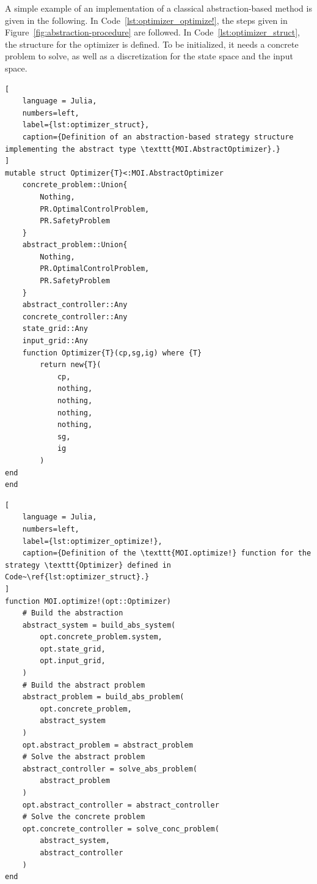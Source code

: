 \documentclass{juliacon}
\begin{document}
A simple example of an implementation of a classical abstraction-based method is given in the following. In Code~\ref{lst:optimizer_optimize!}, the steps given in Figure~\ref{fig:abstraction-procedure} are followed. In Code~\ref{lst:optimizer_struct}, the structure for the optimizer is defined. To be initialized, it needs a concrete problem to solve, as well as a discretization for the state space and the input space.
\begin{lstlisting}[
    language = Julia, 
    numbers=left, 
    label={lst:optimizer_struct}, 
    caption={Definition of an abstraction-based strategy structure implementing the abstract type \texttt{MOI.AbstractOptimizer}.}
]
mutable struct Optimizer{T}<:MOI.AbstractOptimizer
    concrete_problem::Union{
        Nothing, 
        PR.OptimalControlProblem, 
        PR.SafetyProblem
    }
    abstract_problem::Union{
        Nothing, 
        PR.OptimalControlProblem, 
        PR.SafetyProblem
    }
    abstract_controller::Any
    concrete_controller::Any
    state_grid::Any
    input_grid::Any 
    function Optimizer{T}(cp,sg,ig) where {T}
        return new{T}(
            cp, 
            nothing, 
            nothing, 
            nothing, 
            nothing, 
            sg, 
            ig
        )
end
end
\end{lstlisting}
\begin{lstlisting}[
    language = Julia, 
    numbers=left, 
    label={lst:optimizer_optimize!}, 
    caption={Definition of the \texttt{MOI.optimize!} function for the strategy \texttt{Optimizer} defined in Code~\ref{lst:optimizer_struct}.}
]
function MOI.optimize!(opt::Optimizer)
    # Build the abstraction
    abstract_system = build_abs_system(
        opt.concrete_problem.system,
        opt.state_grid,
        opt.input_grid,
    )
    # Build the abstract problem
    abstract_problem = build_abs_problem(
        opt.concrete_problem, 
        abstract_system
    )
    opt.abstract_problem = abstract_problem
    # Solve the abstract problem
    abstract_controller = solve_abs_problem(
        abstract_problem
    )
    opt.abstract_controller = abstract_controller
    # Solve the concrete problem
    opt.concrete_controller = solve_conc_problem(
        abstract_system, 
        abstract_controller
    )
end
\end{lstlisting}
\end{document}
